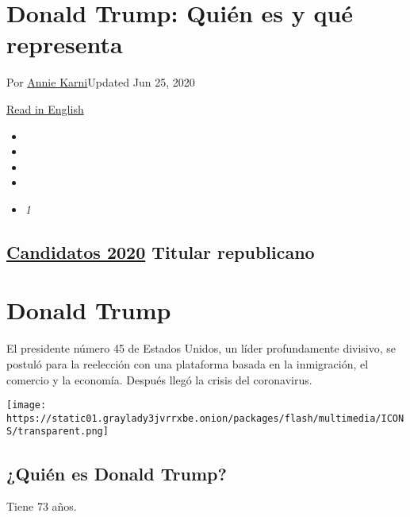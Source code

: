 \hypertarget{donald-trump-quiuxe9n-es-y-quuxe9-representa}{%
\section{Donald Trump: Quién es y qué
representa}\label{donald-trump-quiuxe9n-es-y-quuxe9-representa}}

Por \href{https://www.nytimes3xbfgragh.onion/by/annie-karni}{Annie
Karni}Updated Jun 25, 2020

\href{https://www.nytimes3xbfgragh.onion/interactive/2020/us/elections/donald-trump.html}{Read
in English}

\begin{itemize}
\item
\item
\item
\item
\item
  \emph{1}
\end{itemize}

\hypertarget{candidatos-2020--titular-republicano-}{%
\subsection{\texorpdfstring{\href{https://www.nytimes3xbfgragh.onion/interactive/2019/us/politics/2020-presidential-candidates.html}{Candidatos
2020} Titular republicano
}{Candidatos 2020  Titular republicano }}\label{candidatos-2020--titular-republicano-}}

\hypertarget{donald-trump}{%
\section{Donald Trump}\label{donald-trump}}

El presidente número 45 de Estados Unidos, un líder profundamente
divisivo, se postuló para la reelección con una plataforma basada en la
inmigración, el comercio y la economía. Después llegó la crisis del
coronavirus.

\texttt{[image: https://static01.graylady3jvrrxbe.onion/packages/flash/multimedia/ICONS/transparent.png]}

\hypertarget{quiuxe9n-es-donald-trump}{%
\subsection{¿Quién es Donald Trump?}\label{quiuxe9n-es-donald-trump}}

Tiene 73 años.

